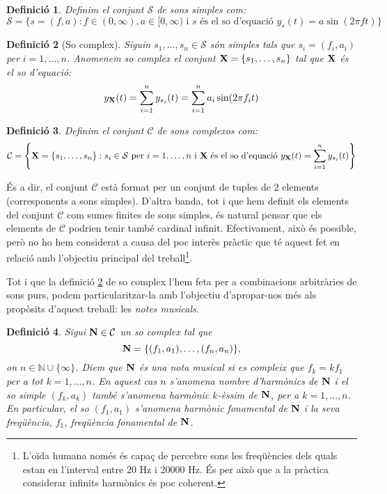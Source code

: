 \documentclass{article}
\theoremstyle{math}
\newtheorem{definition}{Definició}[section]
\theoremstyle{TheoremNum}
\newcommand{\0}{\ensuremath{\vb{0}}}
\newcommand{\N}{\ensuremath{\vb{N}}}
\newcommand{\X}{\ensuremath{\vb{X}}}
\newcommand{\NN}{\ensuremath{\mathbb{N}}} %
\newcommand\Hz{\text{ Hz}}
\begin{document}
\begin{definition}
  Definim el conjunt $\mathcal{S}$ de sons simples com: $$\mathcal{S}=\{s=(f,a):f\in(0,\infty),a\in[0,\infty)\text{ i $s$ és el so d'equació }y_s(t)=a\sin(2\pi ft)\}$$
\end{definition}
\begin{definition}[So complex]\label{so_complex}
  Siguin $s_1,\ldots,s_n\in\mathcal{S}$ són simples tals que $s_i=(f_i,a_i)$ per $i=1,\ldots,n$. Anomenem \textit{so complex} el conjunt $\X=\{s_1,\ldots,s_n\}$ tal que $\X$ és el so d'equació: $$y_{\X}(t)=\sum_{i=1}^ny_{s_i}(t)=\sum_{i=1}^na_i\sin(2\pi f_it)$$
\end{definition}
\begin{definition}
  Definim el conjunt $\mathcal{C}$ de sons complexos com:
  $$\mathcal{C}=\left\{\X=\{s_1,\ldots,s_n\}:s_i\in\mathcal{S}\text{ per } i=1,\ldots,n\text{ i $\X$ és el so d'equació }y_{\X}(t)=\sum_{i=1}^ny_{s_i}(t)\right\}$$
\end{definition}
\noindent És a dir, el conjunt $\mathcal{C}$ està format per un conjunt de tuples de 2 elements (corresponents a sons simples). D'altra banda, tot i que hem definit els elements del conjunt $\mathcal{C}$ com sumes finites de sons simples, és natural pensar que els elements de $\mathcal{C}$ podrien tenir també cardinal infinit. Efectivament, això és possible, però no ho hem considerat a causa del poc interès pràctic que té aquest fet en relació amb l'objectiu principal del treball\footnote{L'oïda humana només és capaç de percebre sons les freqüències dels quals estan en l'interval entre $20\Hz$ i $20000\Hz$. És per això que a la pràctica considerar infinits harmònics és poc coherent.}.\par
Tot i que la definició \ref{so_complex} de so complex l'hem feta per a combinacions arbitràries de sons purs, podem  particularitzar-la amb l'objectiu d'apropar-nos més als propòsits d'aquest treball: les \textit{notes musicals}.
\begin{definition}
  Sigui $\N\in\mathcal{C}$ un so complex tal que $$\N=\{(f_1,a_1),\ldots,(f_n,a_n)\},$$ on $n\in\NN\cup\{\infty\}$. Diem que $\N$ és una \textit{nota musical} si es compleix que $f_k=kf_1$ per a tot $k=1,\ldots,n$. En aquest cas $n$ s'anomena \textit{nombre d'harmònics de $\N$} i el so simple $(f_k,a_k)$ també s'anomena \textit{harmònic $k$-èssim de $\N$}, per a $k=1,\ldots,n$. En particular, el so $(f_1,a_1)$ s'anomena \textit{harmònic fonamental de $\N$} i la seva freqüència, $f_1$, \textit{freqüència fonamental de $\N$}.
\end{definition}
\end{document}
